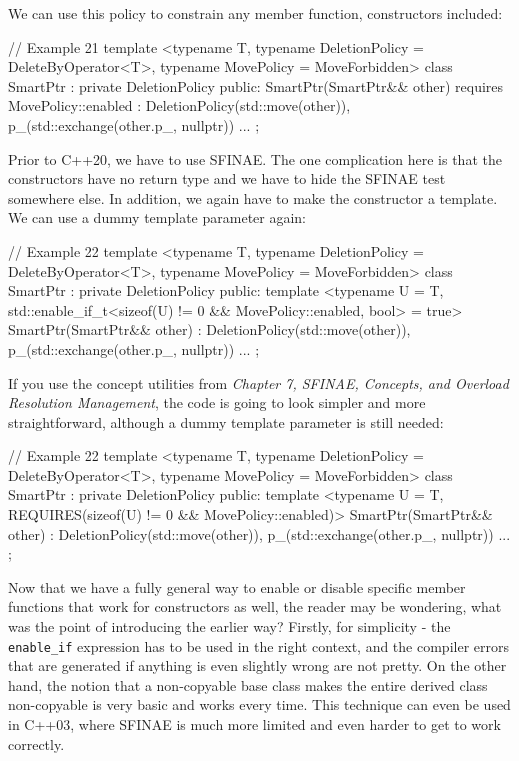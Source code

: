 We can use this policy to constrain any member function, constructors included:

\begin{code}
// Example 21
template <typename T,
          typename DeletionPolicy = DeleteByOperator<T>,
          typename MovePolicy = MoveForbidden>
class SmartPtr : private DeletionPolicy {
  public:
  SmartPtr(SmartPtr&& other)
    requires MovePolicy::enabled :
    DeletionPolicy(std::move(other)),
    p_(std::exchange(other.p_, nullptr)) {}
  ...
};
\end{code}

Prior to C++20, we have to use SFINAE. The one complication here is that the constructors have no return type and we have to hide the SFINAE test somewhere else. In addition, we again have to make the constructor a template. We can use a dummy template parameter again:

\begin{code}
// Example 22
template <typename T,
          typename DeletionPolicy = DeleteByOperator<T>,
          typename MovePolicy = MoveForbidden>
class SmartPtr : private DeletionPolicy {
  public:
  template <typename U = T,
    std::enable_if_t<sizeof(U) != 0 && MovePolicy::enabled,
                     bool> = true>
  SmartPtr(SmartPtr&& other) :
    DeletionPolicy(std::move(other)),
    p_(std::exchange(other.p_, nullptr)) {}
  ...
};
\end{code}

If you use the concept utilities from \emph{Chapter 7, SFINAE, Concepts, and Overload Resolution Management}, the code is going to look simpler and more straightforward, although a dummy template parameter is still needed:

\begin{code}
// Example 22
template <typename T,
          typename DeletionPolicy = DeleteByOperator<T>,
          typename MovePolicy = MoveForbidden>
class SmartPtr : private DeletionPolicy {
  public:
  template <typename U = T,
    REQUIRES(sizeof(U) != 0 && MovePolicy::enabled)>
  SmartPtr(SmartPtr&& other) :
    DeletionPolicy(std::move(other)),
    p_(std::exchange(other.p_, nullptr)) {}
  ...
};
\end{code}

Now that we have a fully general way to enable or disable specific member functions that work for constructors as well, the reader may be wondering, what was the point of introducing the earlier way? Firstly, for simplicity - the \texttt{enable\_if} expression has to be used in the right context, and the compiler errors that are generated if anything is even slightly wrong are not pretty. On the other hand, the notion that a non-copyable base class makes the entire derived class non-copyable is very basic and works every time. This technique can even be used in C++03, where SFINAE is much more limited and even harder to get to work correctly.

